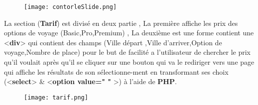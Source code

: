 \documentclass[a4paper,12pt]{report}
\begin{document}
\begin{figure}[H]
\begin{center}
\centering
\texttt{[image: contorleSlide.png]}
\end{center}
\label{Cs}
\end{figure}
La section (\textbf{Tarif}) est divisé en deux partie , La première affiche les prix des options de voyage (Basic,Pro,Premium) , La deuxième est une forme contient une <\textbf{div}> qui contient des champs (Ville départ ,Ville d'arriver,Option de voyage,Nombre de place) pour le but de facilité a l'utilisateur de chercher le prix qu'il voulait après qu'il se cliquer sur une bouton qui va le rediriger vers une page qui affiche les résultats de son sélectionne-ment en transformant ses choix (<\textbf{select}> \& <\textbf{option value=" " }>) à l'aide de \textbf{PHP}.
\begin{figure}[H]
\begin{center}
\centering
\texttt{[image: tarif.png]}
\end{center}
\label{tarif}
\end{figure}
\end{document}
